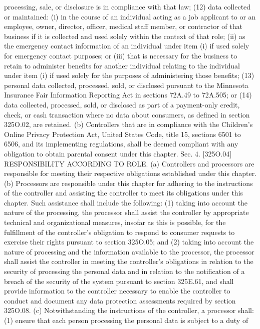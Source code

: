 processing, sale, or disclosure is in compliance with that law;
(12) data collected or maintained:
(i) in the course of an individual acting as a job applicant to or an employee, owner,
director, officer, medical staff member, or contractor of that business if it is collected and
used solely within the context of that role;
(ii) as the emergency contact information of an individual under item (i) if used solely
for emergency contact purposes; or
(iii) that is necessary for the business to retain to administer benefits for another individual
relating to the individual under item (i) if used solely for the purposes of administering those
benefits;
(13) personal data collected, processed, sold, or disclosed pursuant to the Minnesota
Insurance Fair Information Reporting Act in sections 72A.49 to 72A.505; or
(14) data collected, processed, sold, or disclosed as part of a payment-only credit, check,
or cash transaction where no data about consumers, as defined in section 325O.02, are
retained.
(b) Controllers that are in compliance with the Children's Online Privacy Protection Act,
United States Code, title 15, sections 6501 to 6506, and its implementing regulations, shall
be deemed compliant with any obligation to obtain parental consent under this chapter.
Sec. 4. [325O.04] RESPONSIBILITY ACCORDING TO ROLE.
(a) Controllers and processors are responsible for meeting their respective obligations
established under this chapter.
(b) Processors are responsible under this chapter for adhering to the instructions of the
controller and assisting the controller to meet its obligations under this chapter. Such
assistance shall include the following:
(1) taking into account the nature of the processing, the processor shall assist the controller
by appropriate technical and organizational measures, insofar as this is possible, for the
fulfillment of the controller's obligation to respond to consumer requests to exercise their
rights pursuant to section 325O.05; and
(2) taking into account the nature of processing and the information available to the
processor, the processor shall assist the controller in meeting the controller's obligations in
relation to the security of processing the personal data and in relation to the notification of
a breach of the security of the system pursuant to section 325E.61, and shall provide
information to the controller necessary to enable the controller to conduct and document
any data protection assessments required by section 325O.08.
(c) Notwithstanding the instructions of the controller, a processor shall:
(1) ensure that each person processing the personal data is subject to a duty of
